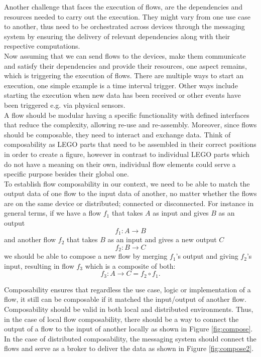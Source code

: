 \noindent Another challenge that faces the execution of  flows, are the dependencies and resources needed to carry out the execution.
 They might vary from one use case to another, thus need to be orchestrated across devices through the messaging system by  ensuring the delivery of relevant dependencies along with their respective computations.\\
 
\noindent Now assuming that we can send flows to the devices, make them communicate and satisfy their dependencies and provide their resources, one aspect remains, which is triggering the execution of flows. There are multiple ways to start an execution, one simple example is a time interval trigger. Other ways include starting the execution when new data has been received or other events have been triggered e.g. via physical sensors.\\


\noindent A flow should be modular having a specific functionality with defined interfaces that reduce the complexity, allowing re-use and re-assembly. Moreover, since flows should be composable, they need to interact and exchange data. Think of composability as LEGO parts that need to be assembled in their correct positions in order to create a figure, however in contrast to individual LEGO parts which do not have a meaning on their own, individual flow elements could serve a specific purpose besides their global one. \\
 
\noindent  To establish flow composability in our context, we need to be able to match the output data of one flow to the input data of another, no matter whether the flows are on the same device or distributed; connected or disconnected. For instance in general terms, if we have a flow \(f_1\) that takes \(A\) as input and gives \(B\) as an output
\[ f_1 : A  \to B  \]
and another flow \(f_2\) that takes \(B\) as an input and gives a new output \(C\)
\[ f_2 : B  \to C  \]
we should be able to compose a new flow by merging  \(f_1\)'s output and giving \(f_2\)'s input, resulting in flow \(f_3\) which is a composite of both:
\[f_3: A \to C = f_2 \circ f_1 .\]

 \noindent Composability ensures that regardless the use case, logic or implementation of a flow, it still can be composable if it matched the input/output of another flow. Composability should be valid in both local and distributed environments. Thus, in the case of local flow composability, there should be a way to connect the output of a flow to the input of another locally as shown in Figure \ref{fig:compose}. In the case of distributed composability, the messaging system should connect the flows and serve as a broker to deliver the data as shown in Figure \ref{fig:compose2}. 

